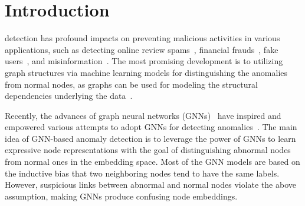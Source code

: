 \section{Introduction}
\label{sec:intro}	
 detection has profound impacts on preventing malicious activities in various applications, such as detecting online review spams~\cite{nabeel2021cadue}, financial frauds~\cite{SemiGNN,liang2019uncovering}, fake users~\cite{fawcett1996combining}, and misinformation~\cite{cui2020deterrent, silva2021propagation2vec}. 
The most promising development is to utilizing graph structures via machine learning models for distinguishing the anomalies from normal nodes, as graphs can be used for modeling the structural dependencies underlying the data~\cite{kumar2018rev2,liu2020alleviating,dou2020enhancing}. 



Recently, the advances of graph neural networks (GNNs)~\cite{kipf2016semi,velivckovic2017graph,Graphsage} have inspired and empowered various attempts to adopt GNNs for detecting anomalies~\cite{liu2020alleviating,dou2020enhancing,shi2022h2,SemiGNN, huang2022auc}. 
The main idea of GNN-based anomaly detection is to leverage the power of GNNs to learn expressive node representations with the goal of distinguishing abnormal nodes from normal ones in the embedding space. Most of the GNN models are based on the inductive bias that two neighboring nodes tend to have the same labels. However, suspicious links between abnormal and normal nodes violate the above assumption, making GNNs produce confusing node embeddings.   

